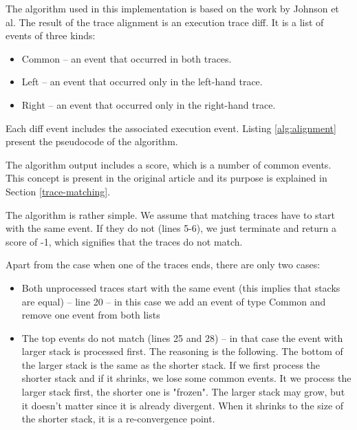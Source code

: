 The algorithm used in this implementation is based on the work by Johnson et al. \cite{ieee:alignment-and-slicing}
The result of the trace alignment is an execution trace diff. It is a list of events of three kinds:
\begin{itemize}
  \item Common -- an event that occurred in both traces.
  \item Left -- an event that occurred only in the left-hand trace.
  \item Right -- an event that occurred only in the right-hand trace.
\end{itemize}

Each diff event includes the associated execution event.
Listing \ref{alg:alignment} present the pseudocode of the algorithm.


                       
The algorithm output includes a score, which is a number of common events.
This concept is present in the original article and its purpose 
is explained in Section \ref{trace-matching}.

The algorithm is rather simple. We assume that matching traces have to start with the same
event. If they do not (lines 5-6), we just terminate and return a score of -1, 
which signifies that the traces do not match.

Apart from the case when one of the traces ends, there are only two cases:
\begin{itemize}
  \item Both unprocessed traces start with the same event (this implies that stacks are equal) -- line 20 -- in this case
  			we add an event of type Common and remove one event from both lists
  \item The top events do not match (lines 25 and 28) -- in that case the event with larger stack is processed first.
           The reasoning is the following. The bottom of the larger stack is the same as the shorter stack.
           If we first process the shorter stack and if it shrinks, we lose some common events.
           It we process the larger stack first, the shorter one is "frozen". The larger stack may grow, but it doesn't matter
           since it is already divergent. When it shrinks to the size of the shorter stack, it is a re-convergence point.
\end{itemize}


